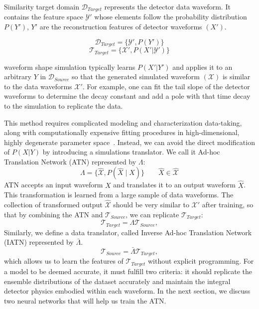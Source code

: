 Similarity target domain $\mathcal{D}_{Target}$ represents the detector data waveform. It contains the feature space $\mathcal{Y'}$ whose elements follow the probability distribution $P(Y')$, $Y'$ are the reconstruction features of detector waveforms $(X')$.

\begin{equation}
\mathcal{D}_{Target}=\{\mathcal{Y}',P(Y')\}
\end{equation}
\begin{equation}
\mathcal{T}_{Target}=\{\mathcal{X}',P(X'|\mathcal{Y}')\}
\end{equation}

waveform shape simulation typically learns $P(X'|Y')$ and applies it to an arbitrary $Y$ in $\mathcal{D}_{Source}$ so that the generated simulated waveform $(\mathcal{X})$ is similar to the data waveforms $\mathcal{X}'$. For example, one can fit the tail slope of the detector waveforms to determine the decay constant and add a pole with that time decay to the simulation to replicate the data. 

This method requires complicated modeling and characterization data-taking, along with computationally expensive fitting procedures in high-dimensional, highly degenerate parameter space~\cite{Ben_Thesis,Sam_Thesis}. Instead, we can avoid the direct modification of  $P(X|Y)$ by introducing a simulations translator. We call it Ad-hoc Translation Network (ATN) represented by $\Lambda$:
\begin{equation}
\Lambda = \{\hat{\mathcal{X}}, P(\hat{X}\mid X)\}\qquad \hat{X}\in \hat{\mathcal{X}}
\label{eqn:ATN}
\end{equation}
ATN accepts an input waveform $X$ and translates it to an output waveform $\hat{X}$. This transformation is learned from a large sample of data waveforms. The collection of transformed output $\hat{\mathcal{X}}$ should be very similar to $\mathcal{X}'$ after training, so that by combining the ATN and $\mathcal{T}_{Source}$, we can replicate $\mathcal{T}_{Target}$:
\begin{equation}
    \mathcal{T}_{Target}=\Lambda \mathcal{T}_{Source} ,
    \label{eqn:ATN_task}
\end{equation}
Similarly, we define a data translator, called Inverse Ad-hoc Translation Network (IATN) represented by $\bar{\Lambda}$.
\begin{equation}
    \mathcal{T}_{Source}= \bar{\Lambda} \mathcal{T}_{Target} ,
    \label{eqn:IATN_task}
\end{equation}
which allows us to learn the features of $\mathcal{T}_{Target}$ without explicit programming. For a model to be deemed accurate, it must fulfill two criteria: it should replicate the ensemble distributions of the dataset accurately and maintain the integral detector physics embodied within each waveform. In the next section, we discuss two neural networks that will help us train the ATN.


